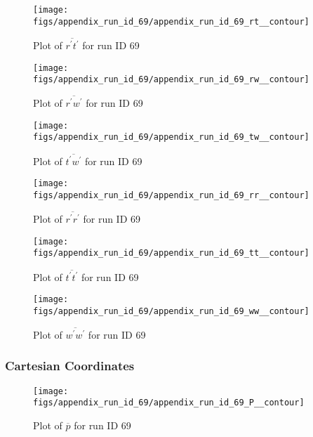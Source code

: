 \begin{figure}[H]
\centering
\texttt{[image: figs/appendix\_run\_id\_69/appendix\_run\_id\_69\_rt\_\_contour]}
\caption{Plot of $\overline{r^\prime t^\prime}$ for run ID 69}
\label{fig:appendix_run_id_69_rt__contour}
\end{figure}


\begin{figure}[H]
\centering
\texttt{[image: figs/appendix\_run\_id\_69/appendix\_run\_id\_69\_rw\_\_contour]}
\caption{Plot of $\overline{r^\prime w^\prime}$ for run ID 69}
\label{fig:appendix_run_id_69_rw__contour}
\end{figure}


\begin{figure}[H]
\centering
\texttt{[image: figs/appendix\_run\_id\_69/appendix\_run\_id\_69\_tw\_\_contour]}
\caption{Plot of $\overline{t^\prime w^\prime}$ for run ID 69}
\label{fig:appendix_run_id_69_tw__contour}
\end{figure}


\begin{figure}[H]
\centering
\texttt{[image: figs/appendix\_run\_id\_69/appendix\_run\_id\_69\_rr\_\_contour]}
\caption{Plot of $\overline{r^\prime r^\prime}$ for run ID 69}
\label{fig:appendix_run_id_69_rr__contour}
\end{figure}


\begin{figure}[H]
\centering
\texttt{[image: figs/appendix\_run\_id\_69/appendix\_run\_id\_69\_tt\_\_contour]}
\caption{Plot of $\overline{t^\prime t^\prime}$ for run ID 69}
\label{fig:appendix_run_id_69_tt__contour}
\end{figure}


\begin{figure}[H]
\centering
\texttt{[image: figs/appendix\_run\_id\_69/appendix\_run\_id\_69\_ww\_\_contour]}
\caption{Plot of $\overline{w^\prime w^\prime}$ for run ID 69}
\label{fig:appendix_run_id_69_ww__contour}
\end{figure}


\subsubsection{Cartesian Coordinates}
\begin{figure}[H]
\centering
\texttt{[image: figs/appendix\_run\_id\_69/appendix\_run\_id\_69\_P\_\_contour]}
\caption{Plot of $\overline{p}$ for run ID 69}
\label{fig:appendix_run_id_69_P__contour}
\end{figure}


